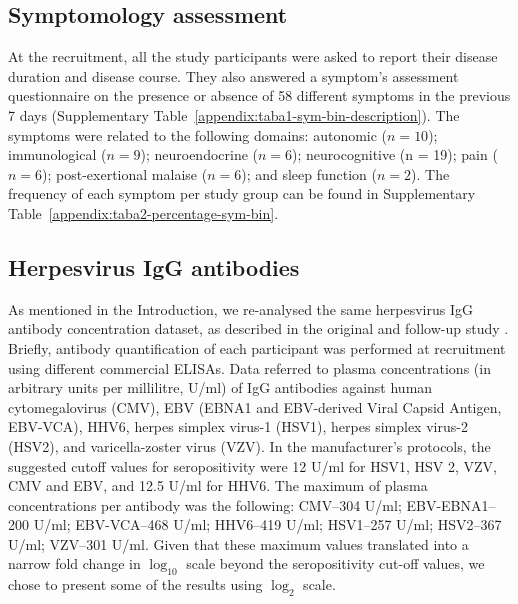 \subsection{Symptomology assessment}

At the recruitment, all the study participants were asked to report their disease duration and disease course. They also answered a symptom's assessment questionnaire
on the presence or absence of 58 different symptoms in the previous 7 days (Supplementary Table~\ref{appendix:taba1-sym-bin-description}). The symptoms were related to the following domains: autonomic ($n = 10$); immunological ($n = 9$); neuroendocrine ($n = 6$); neurocognitive (n = 19); pain ($n = 6$); post-exertional malaise ($n = 6$); and sleep function ($n = 2$). The frequency of each symptom per study group can be found in Supplementary Table~\ref{appendix:taba2-percentage-sym-bin}.


\subsection{Herpesvirus IgG antibodies}

As mentioned in the Introduction, we re-analysed the same herpesvirus IgG antibody concentration dataset, as described in the original and follow-up study \citep{cliff2019CellularImmune, domingues2021HerpesvirusesSerologya}. Briefly, antibody quantification of each participant was performed at recruitment using different commercial ELISAs. Data referred to plasma concentrations (in arbitrary units per millilitre, U/ml) of IgG antibodies against human cytomegalovirus (CMV), EBV (EBNA1 and EBV-derived Viral Capsid Antigen, EBV-VCA), HHV6, herpes simplex virus-1 (HSV1), herpes simplex virus-2 (HSV2), and varicella-zoster virus (VZV). In the manufacturer's protocols, the suggested cutoff values for seropositivity were 12 U/ml for HSV1, HSV 2, VZV, CMV and EBV, and 12.5 U/ml for HHV6. The maximum of plasma concentrations per antibody was the following: CMV--304 U/ml; EBV-EBNA1--200 U/ml; EBV-VCA--468 U/ml; HHV6--419 U/ml; HSV1--257 U/ml; HSV2--367 U/ml; VZV--301 U/ml. Given that these maximum values translated into a narrow fold change in $\log_{10}$ scale beyond the seropositivity cut-off values, we chose to present some of the results using $\log_{2}$ scale.

